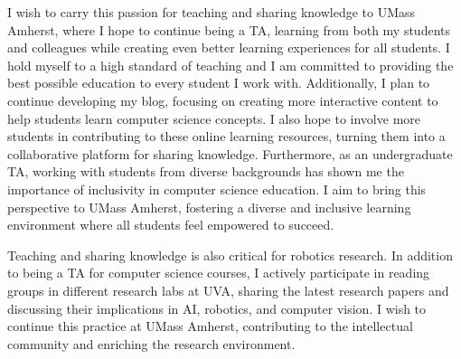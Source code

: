 \documentclass[10pt]{article}
\begin{document}
I wish to carry this passion for teaching and sharing knowledge to UMass Amherst, where I hope to continue being a TA, learning from both my students and colleagues while creating even better learning experiences for all students. I hold myself to a high standard of teaching and I am committed to providing the best possible education to every student I work with. Additionally, I plan to continue developing my blog, focusing on creating more interactive content to help students learn computer science concepts. I also hope to involve more students in contributing to these online learning resources, turning them into a collaborative platform for sharing knowledge. Furthermore, as an undergraduate TA, working with students from diverse backgrounds has shown me the importance of inclusivity in computer science education. I aim to bring this perspective to UMass Amherst, fostering a diverse and inclusive learning environment where all students feel empowered to succeed.

Teaching and sharing knowledge is also critical for robotics research. In addition to being a TA for computer science courses, I actively participate in reading groups in different research labs at UVA, sharing the latest research papers and discussing their implications in AI, robotics, and computer vision. I wish to continue this practice at UMass Amherst, contributing to the intellectual community and enriching the research environment.
\end{document}
